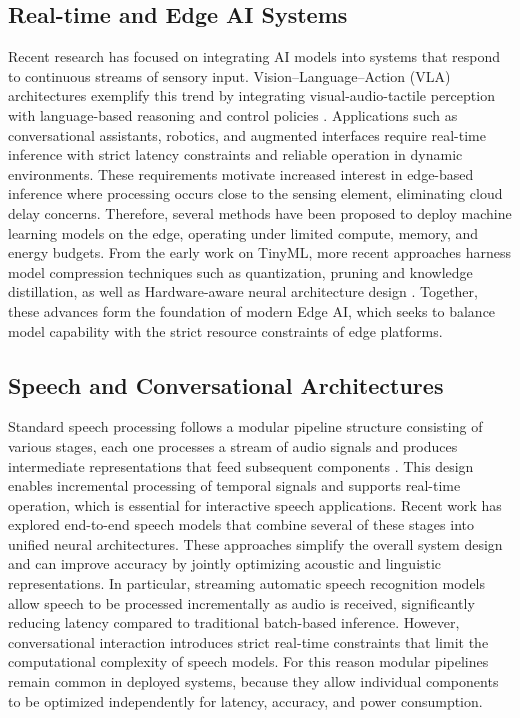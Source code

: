 \documentclass[conference]{IEEEtran}
\begin{document}
\subsection{Real-time and Edge AI Systems}
Recent research has focused on integrating AI models into systems that respond to continuous streams of sensory input. Vision–Language–Action (VLA) architectures exemplify this trend by integrating visual-audio-tactile perception with language-based reasoning and control policies \cite{huang2026tactilevla} \cite{huang2026tafvlatactileforcealignmentvisionlanguageaction} \cite{bi2025vlatouchenhancingvisionlanguageactionmodels}. Applications such as conversational assistants, robotics, and augmented interfaces require real-time inference with strict latency constraints and reliable operation in dynamic environments.
These requirements motivate increased interest in edge-based inference where processing occurs close to the sensing element, eliminating cloud delay concerns.
Therefore, several methods have been proposed to deploy machine learning models on the edge, operating under limited compute, memory, and energy budgets. From the early work on TinyML, more recent approaches harness model compression techniques such as quantization, pruning and knowledge distillation, as well as Hardware-aware neural architecture design \cite{dnn_compression}.
Together, these advances form the foundation of modern Edge AI, which seeks to balance model capability with the strict resource constraints of edge platforms.
\subsection{Speech and Conversational Architectures}
Standard speech processing follows a modular pipeline structure consisting of various stages, each one processes a stream of audio signals and produces intermediate representations that feed subsequent components \cite{s24165199}. This design enables incremental processing of temporal signals and supports real-time operation, which is essential for interactive speech applications.
Recent work has explored end-to-end speech models \cite{amini2025lfm2technicalreport} that combine several of these stages into unified neural architectures. These approaches simplify the overall system design and can improve accuracy by jointly optimizing acoustic and linguistic representations. In particular, streaming automatic speech recognition models allow speech to be processed incrementally as audio is received, significantly reducing latency compared to traditional batch-based inference.
However, conversational interaction introduces strict real-time constraints that limit the computational complexity of speech models.
For this reason modular pipelines remain common in deployed systems, because they allow individual components to be optimized independently for latency, accuracy, and power consumption.
\end{document}
